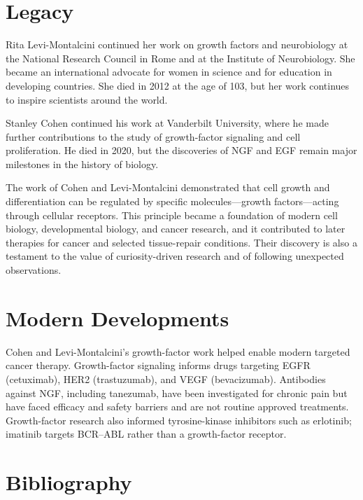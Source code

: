 \section{Legacy}

Rita Levi-Montalcini continued her work on growth factors and neurobiology at the National Research Council in Rome and at the Institute of Neurobiology. She became an international advocate for women in science and for education in developing countries. She died in 2012 at the age of 103, but her work continues to inspire scientists around the world.

Stanley Cohen continued his work at Vanderbilt University, where he made further contributions to the study of growth-factor signaling and cell proliferation. He died in 2020, but the discoveries of NGF and EGF remain major milestones in the history of biology.

The work of Cohen and Levi-Montalcini demonstrated that cell growth and differentiation can be regulated by specific molecules---growth factors---acting through cellular receptors. This principle became a foundation of modern cell biology, developmental biology, and cancer research, and it contributed to later therapies for cancer and selected tissue-repair conditions. Their discovery is also a testament to the value of curiosity-driven research and of following unexpected observations.


\section{Modern Developments}

Cohen and Levi-Montalcini's growth-factor work helped enable modern targeted cancer therapy. Growth-factor signaling informs drugs targeting EGFR (cetuximab), HER2 (trastuzumab), and VEGF (bevacizumab). Antibodies against NGF, including tanezumab, have been investigated for chronic pain but have faced efficacy and safety barriers and are not routine approved treatments. Growth-factor research also informed tyrosine-kinase inhibitors such as erlotinib; imatinib targets BCR--ABL rather than a growth-factor receptor.


\section{Bibliography}

